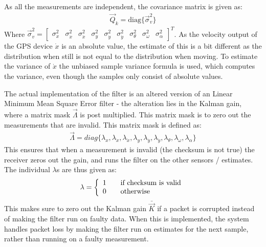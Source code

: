 \documentclass{ifacconf}
\begin{document}
As all the measurements are independent, the covariance matrix is given as:
\begin{align}
\vec{Q}_k = \text{diag}\{\vec{\sigma}^2_{v}\}
\end{align}
Where $\vec{\sigma}^2_{v} = \begin{bmatrix}\sigma^2_x & \sigma^2_{\dot{x}} & \sigma^2_{{\ddot{x}}} & \sigma^2_y & \sigma^2_{\dot{y}} & \sigma^2_{{\ddot{y}}} & \sigma^2_\theta & \sigma^2_\omega & \sigma^2_\alpha \end{bmatrix}^T$. As the velocity output of the GPS device $\dot{x}$ is an absolute value, the estimate of this is a bit different as the distribution when still is not equal to the distribution when moving. To estimate the variance of $\dot{x}$ the unbiased sample variance formula is used, which computes the variance, even though the samples only consist of absolute values. 

The actual implementation of the filter is an altered version of an Linear Minimum Mean Square Error filter - the alteration lies in the Kalman gain, where a matrix mask $\vec{\Lambda}$ is post multiplied. This matrix mask is to zero out the measurements that are invalid. This matrix mask is defined as:
\begin{align}
\vec{\Lambda} = diag\{ \lambda_x,\lambda_{\dot{x}},\lambda_{\ddot{x}},\lambda_y,\lambda_{\dot{y}},\lambda_{\ddot{y}},\lambda_{\theta},\lambda_{\omega},\lambda_{\alpha} \}
\end{align}
This ensures that when a measurement is invalid (the checksum is not true) the receiver zeros out the gain, and runs the filter on the other sensors / estimates. The individual $\lambda$s are thus given as:
\begin{align}
\lambda = 
\left\{
  \begin{array}{l l}
    1 & \quad \text{if checksum is valid}\\
    0 & \quad \text{otherwise}
  \end{array} \right.
\end{align} 
This makes sure to zero out the Kalman gain $\bar{\vec{K}}$ if a packet is corrupted instead of making the filter run on faulty data. When this is implemented, the system handles packet loss by making the filter run on estimates for the next sample, rather than running on a faulty measurement.
\end{document}
